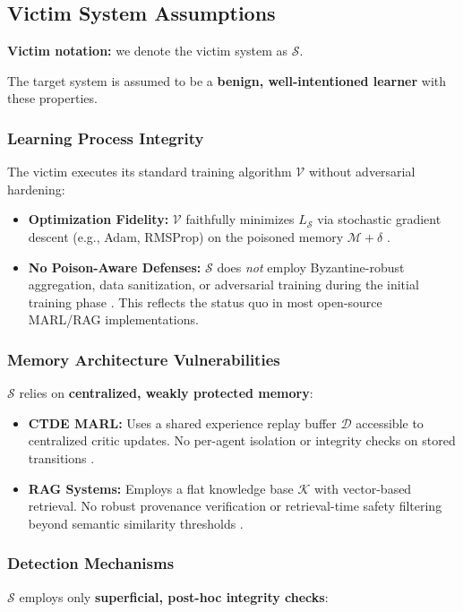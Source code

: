 \documentclass[conference]{IEEEtran}
\begin{document}
\subsection{Victim System Assumptions}
\textbf{Victim notation:} we denote the victim system as $\mathcal{S}$.

The target system is assumed to be a \textbf{benign, well-intentioned learner} with these properties.

\subsubsection{Learning Process Integrity}
The victim executes its standard training algorithm $\mathcal{V}$ without adversarial hardening:

\begin{itemize}
\item \textbf{Optimization Fidelity:} $\mathcal{V}$ faithfully minimizes $L_{\mathcal{S}}$ via stochastic gradient descent (e.g., Adam, RMSProp) on the poisoned memory $\mathcal{M}+\delta$ \cite{Ref12, Ref42}.
\item \textbf{No Poison-Aware Defenses:} $\mathcal{S}$ does \textit{not} employ Byzantine-robust aggregation, data sanitization, or adversarial training during the initial training phase \cite{Ref18, Ref30}. This reflects the status quo in most open-source MARL/RAG implementations.
\end{itemize}

\subsubsection{Memory Architecture Vulnerabilities}
$\mathcal{S}$ relies on \textbf{centralized, weakly protected memory}:

\begin{itemize}
\item \textbf{CTDE MARL:} Uses a shared experience replay buffer $\mathcal{D}$ accessible to centralized critic updates. No per-agent isolation or integrity checks on stored transitions \cite{Ref6, Ref11}.
\item \textbf{RAG Systems:} Employs a flat knowledge base $\mathcal{K}$ with vector-based retrieval. No robust provenance verification or retrieval-time safety filtering beyond semantic similarity thresholds \cite{Ref2, Ref14}.
\end{itemize}

\subsubsection{Detection Mechanisms}
$\mathcal{S}$ employs only \textbf{superficial, post-hoc integrity checks}:
\end{document}
